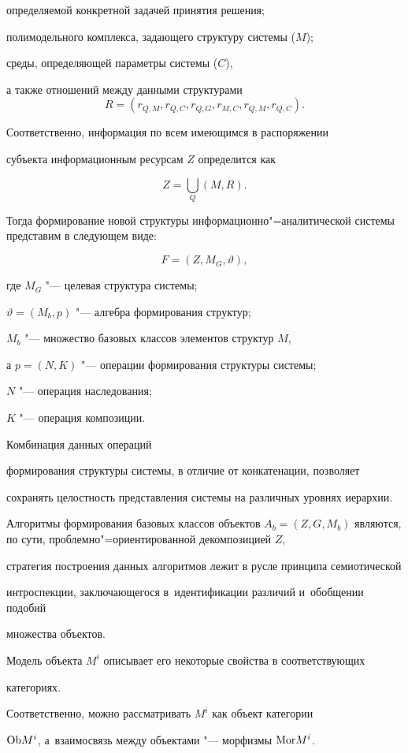 определяемой конкретной задачей принятия решения;

полимодельного комплекса, задающего структуру системы ($M$);

среды, определяющей параметры системы ($C$),

а также отношений между данными структурами $$R=\left( r_{Q, M}, r_{Q, C}, r_{Q, G}, r_{M, C}, r_{Q, M}, r_{Q, C} \right).$$

Соответственно, информация по всем имеющимся в распоряжении

субъекта информационным ресурсам $Z$ определится как

$$Z=\bigcup\limits_Q ( M, R) .$$

Тогда формирование новой структуры информационно"=аналитической системы представим в следующем виде:

$$F=\left( Z, M_G, \vartheta  \right),$$

где $M_G $ "--- целевая структура системы;

$\vartheta =( M_b , p)$ "--- алгебра формирования структур;

$M_b $ "--- множество базовых классов элементов структур $M$,

а $p=( N, K)$ "--- операции формирования структуры системы;

$N$ "--- операция наследования;

$K$ "--- операция композиции.

Комбинация данных операций

формирования структуры системы, в отличие от конкатенации, позволяет

сохранять целостность представления системы на различных уровнях иерархии.

Алгоритмы формирования базовых классов объектов $A_b =(Z, G, M_b )$ являются, по сути, проблемно"=ориентированной декомпозицией $Z$,

стратегия построения данных алгоритмов лежит в русле принципа семиотической

интроспекции, заключающегося в~идентификации различий и~обобщении подобий

множества объектов.



Модель объекта $M^i$ описывает его некоторые свойства в соответствующих

категориях.

Соответственно, можно рассматривать $M^i$ как объект категории

${\rm Ob} M^i$, а~взаимосвязь между объектами "--- морфизмы ${\rm Mor} M^i$.

